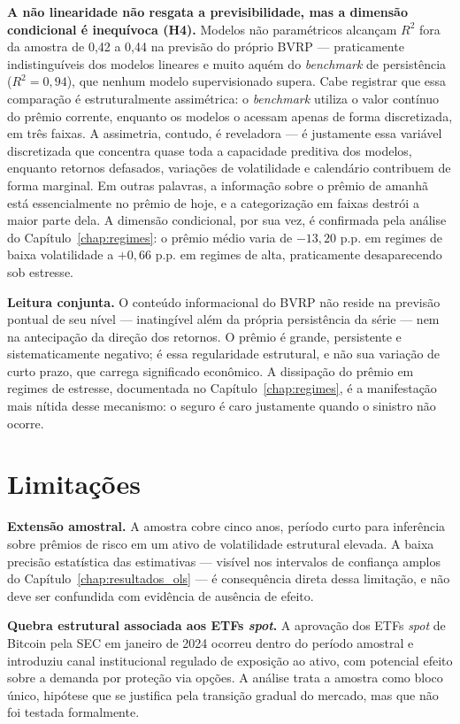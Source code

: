 \textbf{A não linearidade não resgata a previsibilidade, mas a dimensão condicional é inequívoca (H4).} Modelos não paramétricos alcançam $R^2$ fora da amostra de 0,42 a 0,44 na previsão do próprio BVRP --- praticamente indistinguíveis dos modelos lineares e muito aquém do \emph{benchmark} de persistência ($R^2 = 0{,}94$), que nenhum modelo supervisionado supera. Cabe registrar que essa comparação é estruturalmente assimétrica: o \emph{benchmark} utiliza o valor contínuo do prêmio corrente, enquanto os modelos o acessam apenas de forma discretizada, em três faixas. A assimetria, contudo, é reveladora --- é justamente essa variável discretizada que concentra quase toda a capacidade preditiva dos modelos, enquanto retornos defasados, variações de volatilidade e calendário contribuem de forma marginal. Em outras palavras, a informação sobre o prêmio de amanhã está essencialmente no prêmio de hoje, e a categorização em faixas destrói a maior parte dela. A dimensão condicional, por sua vez, é confirmada pela análise do Capítulo~\ref{chap:regimes}: o prêmio médio varia de $-13{,}20$ p.p. em regimes de baixa volatilidade a $+0{,}66$ p.p. em regimes de alta, praticamente desaparecendo sob estresse.

\textbf{Leitura conjunta.} O conteúdo informacional do BVRP não reside na previsão pontual de seu nível --- inatingível além da própria persistência da série --- nem na antecipação da direção dos retornos. O prêmio é grande, persistente e sistematicamente negativo; é essa regularidade estrutural, e não sua variação de curto prazo, que carrega significado econômico. A dissipação do prêmio em regimes de estresse, documentada no Capítulo~\ref{chap:regimes}, é a manifestação mais nítida desse mecanismo: o seguro é caro justamente quando o sinistro não ocorre.

\section{Limitações}
\label{sec:conclusao_limitacoes}

\textbf{Extensão amostral.} A amostra cobre cinco anos, período curto para inferência sobre prêmios de risco em um ativo de volatilidade estrutural elevada. A baixa precisão estatística das estimativas --- visível nos intervalos de confiança amplos do Capítulo~\ref{chap:resultados_ols} --- é consequência direta dessa limitação, e não deve ser confundida com evidência de ausência de efeito.

\textbf{Quebra estrutural associada aos ETFs \emph{spot}.} A aprovação dos ETFs \emph{spot} de Bitcoin pela SEC em janeiro de 2024 ocorreu dentro do período amostral e introduziu canal institucional regulado de exposição ao ativo, com potencial efeito sobre a demanda por proteção via opções. A análise trata a amostra como bloco único, hipótese que se justifica pela transição gradual do mercado, mas que não foi testada formalmente.

